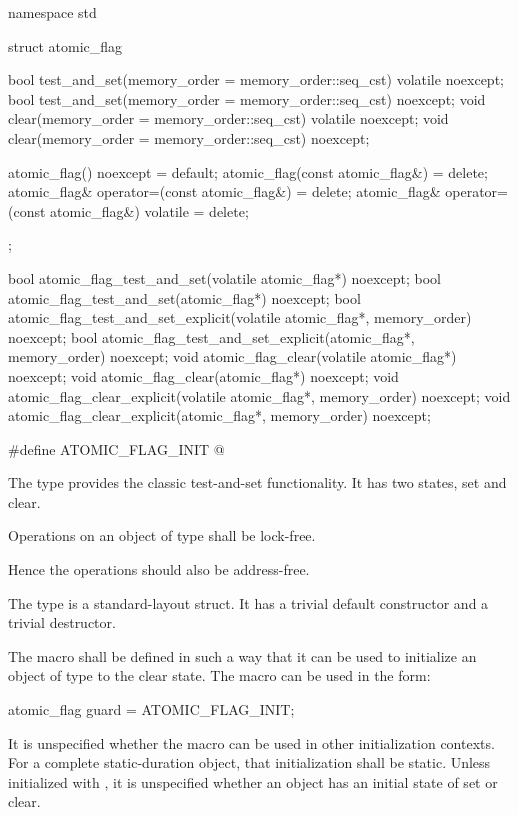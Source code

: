 \begin{codeblock}
namespace std {
  struct atomic_flag {
    bool test_and_set(memory_order = memory_order::seq_cst) volatile noexcept;
    bool test_and_set(memory_order = memory_order::seq_cst) noexcept;
    void clear(memory_order = memory_order::seq_cst) volatile noexcept;
    void clear(memory_order = memory_order::seq_cst) noexcept;

    atomic_flag() noexcept = default;
    atomic_flag(const atomic_flag&) = delete;
    atomic_flag& operator=(const atomic_flag&) = delete;
    atomic_flag& operator=(const atomic_flag&) volatile = delete;
  };

  bool atomic_flag_test_and_set(volatile atomic_flag*) noexcept;
  bool atomic_flag_test_and_set(atomic_flag*) noexcept;
  bool atomic_flag_test_and_set_explicit(volatile atomic_flag*, memory_order) noexcept;
  bool atomic_flag_test_and_set_explicit(atomic_flag*, memory_order) noexcept;
  void atomic_flag_clear(volatile atomic_flag*) noexcept;
  void atomic_flag_clear(atomic_flag*) noexcept;
  void atomic_flag_clear_explicit(volatile atomic_flag*, memory_order) noexcept;
  void atomic_flag_clear_explicit(atomic_flag*, memory_order) noexcept;

  #define ATOMIC_FLAG_INIT @\seebelow@
}
\end{codeblock}

\pnum
The  type provides the classic test-and-set functionality. It has two states, set and clear.

\pnum
Operations on an object of type  shall be lock-free. \begin{note} Hence
the operations should also be address-free. \end{note}

\pnum
The  type is a standard-layout struct.
It has a trivial default constructor and a trivial destructor.

\pnum
The macro  shall be defined in such a way that it can be used to initialize an object of type  to the
clear state. The macro can be used in the form:
\begin{codeblock}
atomic_flag guard = ATOMIC_FLAG_INIT;
\end{codeblock}
It is unspecified whether the macro can be used in other initialization contexts.
For a complete static-duration object, that initialization shall be static.
Unless initialized with , it is unspecified whether an
 object has an initial state of set or clear.

